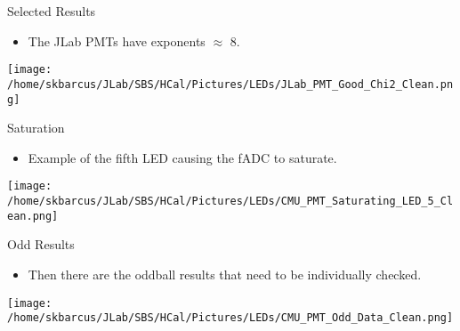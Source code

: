 \documentclass[10pt]{beamer}
\begin{document}
\begin{frame}{Selected Results}

	\begin{itemize}
		\item The JLab PMTs have exponents $\approx$ 8.
	\end{itemize}
	
	\begin{center}
		\texttt{[image: /home/skbarcus/JLab/SBS/HCal/Pictures/LEDs/JLab\_PMT\_Good\_Chi2\_Clean.png]}
  	\end{center}

\end{frame}

\begin{frame}{Saturation}

	\begin{itemize}
		\item Example of the fifth LED causing the fADC to saturate.
	\end{itemize}
	
	\begin{center}
		\texttt{[image: /home/skbarcus/JLab/SBS/HCal/Pictures/LEDs/CMU\_PMT\_Saturating\_LED\_5\_Clean.png]}
  	\end{center}

\end{frame}

\begin{frame}{Odd Results}

	\begin{itemize}
		\item Then there are the oddball results that need to be individually checked.
	\end{itemize}
	
	\begin{center}
		\texttt{[image: /home/skbarcus/JLab/SBS/HCal/Pictures/LEDs/CMU\_PMT\_Odd\_Data\_Clean.png]}
  	\end{center}

\end{frame}
\end{document}
